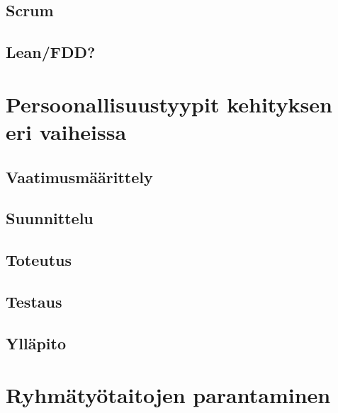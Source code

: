 \documentclass[finnish]{../tktltiki2}
\theoremstyle{definition}
\theoremstyle{remark}
\begin{document}
\subsection{Scrum}

\subsection{Lean/FDD?}

\section{Persoonallisuustyypit kehityksen eri vaiheissa}

\subsection{Vaatimusmäärittely}
\subsection{Suunnittelu}
\subsection{Toteutus}
\subsection{Testaus}
\subsection{Ylläpito}

\section{Ryhmätyötaitojen parantaminen}


%
%
% 
%



\end{document}
